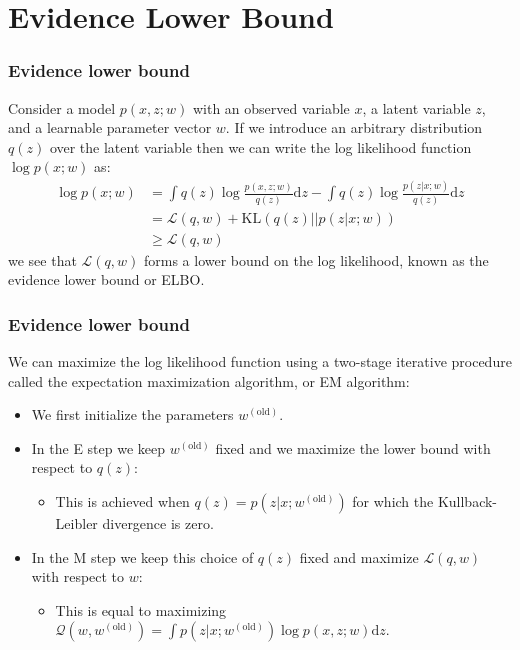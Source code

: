 \documentclass{beamer}
\begin{document}
\section{Evidence Lower Bound}

\begin{frame}
    \frametitle{Evidence lower bound}
    Consider a model $p(x,z;w)$ with an observed variable $x$, a latent variable $z$, and a learnable parameter vector $w$. If we introduce an arbitrary distribution $q(z)$ over the latent variable then we can write the log likelihood function $\log{}p(x;w)$ as:
    \begin{align*}
        \log{}p(x;w)&=\int{}q(z)\log\frac{p(x,z;w)}{q(z)}\mathrm{d}z-\int{}q(z)\log\frac{p(z|x;w)}{q(z)}\mathrm{d}z \\
        &=\mathcal{L}(q,w)+\mathrm{KL}(q(z)||p(z|x;w)) \\
        &\ge\mathcal{L}(q,w)
    \end{align*}
    we see that $\mathcal{L}(q,w)$ forms a lower bound on the log likelihood, known as the evidence lower bound or ELBO.
\end{frame}

\begin{frame}
    \frametitle{Evidence lower bound}
    We can maximize the log likelihood function using a two-stage iterative procedure called the expectation maximization algorithm, or EM algorithm:
    \begin{itemize}
        \item We first initialize the parameters $w^{(\textrm{old})}$.
        \item In the E step we keep $w^{(\textrm{old})}$ fixed and we maximize the lower bound with respect to $q(z)$:
        \begin{itemize}
            \item This is achieved when $q(z)=p(z|x;w^{(\textrm{old})})$ for which the Kullback-Leibler divergence is zero.
        \end{itemize}
        \item In the M step we keep this choice of $q(z)$ fixed and maximize $\mathcal{L}(q,w)$ with respect to $w$:
        \begin{itemize}
            \item This is equal to maximizing $\mathcal{Q}(w,w^{(\textrm{old})})=\int{}p(z|x;w^{(\textrm{old})})\log{}p(x,z;w)\mathrm{d}z$.
        \end{itemize}
    \end{itemize}
\end{frame}
\end{document}
